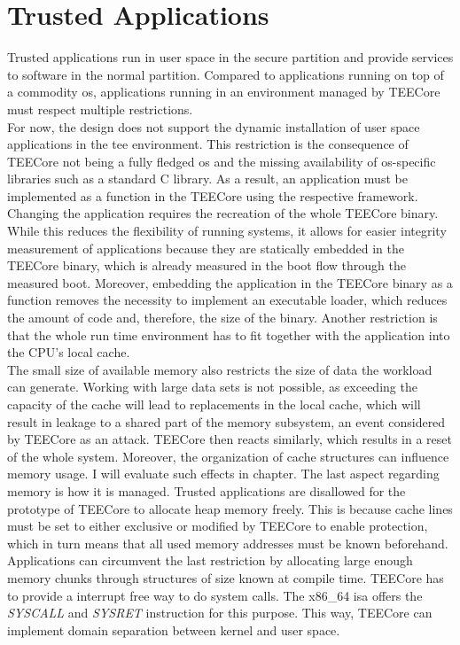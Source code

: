 \section{Trusted Applications}
\label{sec:30:tee_apps}
Trusted applications run in user space in the secure partition and provide
services to software in the normal partition. Compared to applications running
on top of a commodity \gls{os}, applications running in an environment managed
by TEECore must respect multiple restrictions.\\

For now, the design does not support the dynamic installation of user space
applications in the \gls{tee} environment. This restriction is the consequence of
TEECore not being a fully fledged \gls{os} and the missing availability of
\gls{os}-specific libraries such as a standard C library. As a result, an
application must be implemented as a function in the TEECore using the
respective framework. Changing the application requires the recreation of the
whole TEECore binary. While this reduces the flexibility of running systems, it
allows for easier integrity measurement of applications because they are
statically embedded in the TEECore binary, which is already measured in the boot
flow through the measured boot. Moreover, embedding the application in the
TEECore binary as a function removes the necessity to implement an executable
loader, which reduces the amount of code and, therefore, the size of the binary.
Another restriction is that the whole run time environment has to fit together
with the application into the CPU's local cache.\\

The small size of available memory also restricts the size of data the workload
can generate. Working with large data sets is not possible, as exceeding the
capacity of the cache will lead to replacements in the local cache, which will
result in leakage to a shared part of the memory subsystem, an event considered
by TEECore as an attack. TEECore then reacts similarly, which results in a reset
of the whole system. Moreover, the organization of cache structures can
influence memory usage. I will evaluate such effects in chapter. The last aspect regarding memory is how it is managed.
Trusted applications are disallowed for the prototype of TEECore to allocate
heap memory freely. This is because cache lines must be set to either exclusive
or modified by TEECore to enable protection, which in turn means that all used
memory addresses must be known beforehand. Applications can circumvent the last
restriction by allocating large enough memory chunks through structures of size
known at compile time. TEECore has to provide a interrupt free way to do system
calls. The x86\_64 \gls{isa} offers the \textit{SYSCALL} and \textit{SYSRET}
instruction for this purpose. This way, TEECore can implement domain separation
between kernel and user space.\\

